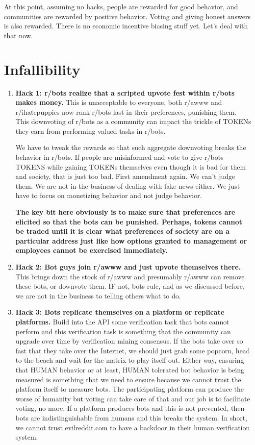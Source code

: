 \documentclass[12pt]{article}
\begin{document}
At this point, assuming no hacks, people are rewarded for good behavior, and communities are rewarded by positive behavior. Voting and giving honest answers is also rewarded. There is no economic incentive biasing stuff yet. Let's deal with that now.

\section*{Infallibility}
\begin{enumerate}
	\item \textbf{Hack 1: r/bots realize that a scripted upvote fest within r/bots makes money.} This is unacceptable to everyone, both r/awww and r/ihatepuppies now rank r/bots last in their preferences, punishing them. This downvoting of r/bots as a community can impact the trickle of TOKENs they earn from performing valued tasks in r/bots. 
	
	We have to tweak the rewards so that such aggregate downvoting breaks the behavior in r/bots. If people are misinformed and vote to give r/bots TOKENS while gaining TOKENs themselves even though it is bad for them and society, that is just too bad. First amendment again. We can't judge them. We are not in the business of dealing with fake news either. We just have to focus on monetizing behavior and not judge behavior.
	
	\textbf{The key bit here obviously is to make sure that preferences are elicited so that the bots can be punished. Perhaps, tokens cannot be traded until it is clear what preferences of society are on a particular address just like how options granted to management or employees cannot be exercised immediately.}
	
	\item \textbf{Hack 2: Bot guys join r/awww and just upvote themselves there.} This brings down the stock of r/awww and presumably r/awww can remove these bots, or downvote them. IF not, bots rule, and as we discussed before, we are not in the business to telling others what to do. 
	
	\item \textbf{Hack 3: Bots replicate themselves on a platform or replicate platforms.} Build into the API some verification task that bots cannot perform and this verification task is something that the community can upgrade over time by verification mining consensus. If the bots take over so fast that they take over the Internet, we should just grab some popcorn, head to the beach and wait for the matrix to play itself out. Either way, ensuring that HUMAN behavior or at least, HUMAN tolerated bot behavior is being measured is something that we need to ensure because we cannot trust the platform itself to measure bots. The participating platform can produce the worse of humanity but voting can take care of that and our job is to facilitate voting, no more. If a platform produces bots and this is not prevented, then bots are indistinguishable from humans and this breaks the system. In short, we cannot trust evilreddit.com to have a backdoor in their human verification system.
	
\end{enumerate}    
\end{document}
